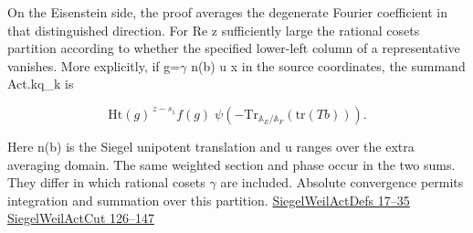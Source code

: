 \documentclass[11pt,letterpaper]{article}
\begin{document}
On the Eisenstein side, the proof averages the degenerate Fourier coefficient in that distinguished direction. For Re z sufficiently large the rational cosets partition according to whether the specified lower-left column of a representative vanishes. More explicitly, if g=\ensuremath{\gamma} n(b) u x in the source coordinates, the summand {\ttfamily\small Act.\allowbreak{}kq\_\allowbreak{}k} is

\[\mathrm{Ht}(g)^{\,z-s_1} f(g)\;
    \psi\!\left(-\mathrm{Tr}_{\mathbb A_E/\mathbb A_F}
                          (\mathrm{tr}(Tb))\right).\]

Here n(b) is the Siegel unipotent translation and u ranges over the extra averaging domain. The same weighted section and phase occur in the two sums. They differ in which rational cosets \ensuremath{\gamma} are included. Absolute convergence permits integration and summation over this partition. \href{https://github.com/nousentllc/riemann-hypothesis/blob/40e56bab026552e089d7afcfeff08d2defb9c005/src/Development/AutomorphicArithmetic/Foundations/GaloisRepresentations/ThetaParseval/ThetaKernels/SiegelWeilActDefs.lean\#L17-L35}{SiegelWeilActDefs 17–35} \href{https://github.com/nousentllc/riemann-hypothesis/blob/40e56bab026552e089d7afcfeff08d2defb9c005/src/Development/AutomorphicArithmetic/Foundations/GaloisRepresentations/ThetaParseval/ThetaKernels/SiegelWeilActCut.lean\#L126-L147}{SiegelWeilActCut 126–147}
\end{document}
